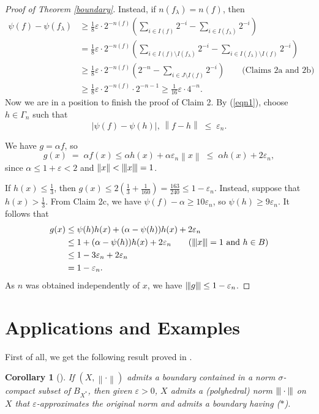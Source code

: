 \documentclass[12pt,a4paper]{amsart}
\newtheorem{corollary}[theorem]{Corollary}
\theoremstyle{definition}
\theoremstyle{remark}
\newcommand{\eps}{\ensuremath{\varepsilon}}
\newcommand{\n}[1]{\ensuremath{\left\|{#1}\right\|}}
\newcommand{\ndot}{\ensuremath{\left\|\cdot\right\|}}
\newcommand{\st}{($*$)}
\newcommand{\tri}{{\displaystyle |\kern-.9pt|\kern-.9pt|}}
\newcommand{\tn}[1]{\ensuremath{\tri{#1}\tri}}
\newcommand{\tndot}{\ensuremath{\tri\cdot\tri}}
\begin{document}
\begin{proof}[Proof of Theorem \ref{boundary}]
Instead, if $n(f_\lambda)=n(f)$, then
\begin{align*}
\psi(f) - \psi(f_\lambda) &\geq {\textstyle \frac{1}{8}}\eps\cdot
2^{-n(f)}\left(\sum_{i \in I(f)} 2^{-i} - \sum_{i \in I(f_\lambda)}
2^{-i} \right)\\
&= {\textstyle \frac{1}{8}}\eps\cdot 2^{-n(f)}\left(\sum_{i \in
I(f)\setminus I(f_\lambda)} 2^{-i} - \sum_{i \in
I(f_\lambda)\setminus I(f)} 2^{-i} \right)\\
&\geq {\textstyle \frac{1}{8}}\eps\cdot 2^{-n(f)}\left(2^{-n} -
\sum_{i
\in J\setminus I(f)} 2^{-i} \right) \qquad\text{(Claims 2a and 2b)}\\
&\geq {\textstyle \frac{1}{8}}\eps\cdot 2^{-n(f)}\cdot 2^{-n-1}
\geq {\textstyle \frac{1}{16}}\eps\cdot 4^{-n}.
\end{align*}
Now we are in a position to finish the proof of Claim 2. By
(\ref{eqn1}), choose $h \in \Gamma_n$ such that
\[
|\psi(f)-\psi(h)|,\, \n{f-h} \;\leq\; \eps_n.
\]

We have $g = \alpha f$, so
\[
g(x) \;=\; \alpha f(x) \leq \alpha h(x) + \alpha \eps_n \n{x}
\;\leq\; \alpha h(x) + 2\eps_n,
\]
since $\alpha \leq 1 + \eps < 2$ and $\n{x} < \tn{x} = 1$.

If $h(x) \leq \frac{1}{3}$, then $g(x) \leq 2(\frac{1}{3}+
\frac{1}{160}) = \frac{163}{240} \leq 1 - \eps_n$. Instead, suppose
that $h(x) > \frac{1}{3}$. From Claim 2c, we have $\psi(f) - \alpha
\geq 10\eps_n$, so $\psi(h) \geq 9\eps_n$. It follows that
\begin{align*}
g(x) &\leq \psi(h)h(x) + (\alpha - \psi(h))h(x) + 2\eps_n\\
&\leq 1 + (\alpha - \psi(h))h(x) + 2\eps_n \qquad\text{($\tn{x}
= 1$ and $h \in B$)}\\
&\leq 1 - 3\eps_n  + 2\eps_n\\
&= 1 - \eps_n.
\end{align*}
As $n$ was obtained independently of $x$, we have
$\tn{g} \leq 1 - \eps_n$.
\end{proof}

\section{Applications and Examples}\label{non-sep}

First of all, we get the following result proved in \cite{fonf3}.

\begin{corollary}[\cite{fonf3}]\label{sigma-compact-boundary}
If $(X,\ndot)$ admits a boundary contained in a norm $\sigma$-compact
subset of $B_{X^*}$, then given $\eps>0$, $X$ admits a
(polyhedral) norm $\tndot$ on $X$ that $\eps$-approximates the
original norm and admits a boundary having {\st}.
\end{corollary}
\end{document}
